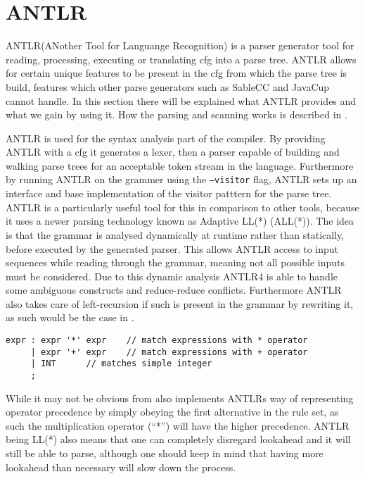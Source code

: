 \section{ANTLR}
ANTLR(ANother Tool for Languange Recognition) is a parser generator tool for reading, processing, executing or translating \gls{cfg} into a parse tree.
ANTLR allows for certain unique features to be present in the \gls{cfg} from which the parse tree is build, features which other parse generators such as SableCC and JavaCup cannot handle. %
In this section there will be explained what ANTLR provides and what we gain by using it.
How the parsing and scanning works is described in .

ANTLR is used for the syntax analysis part of the compiler.
By providing ANTLR with a \gls{cfg} it generates a lexer, then a parser capable of building and walking parse trees for an acceptable token stream in the language.
Furthermore by running ANTLR on the grammer using the \texttt{--visitor} flag, ANTLR sets up an interface and base implementation of the visitor patttern for the parse tree. 
ANTLR is a particularly useful tool for this in comparison to other tools, because it uses a newer parsing technology known as Adaptive LL(*) (ALL(*)).
The idea is that the grammar is analysed dynamically at runtime rather than statically, before executed by the generated parser.
This allows ANTLR access to input sequences while reading through the grammar, meaning not all possible inputs must be considered.
Due to this dynamic analysis ANTLR4 is able to handle some ambiguous constructs and reduce-reduce conflicts.
Furthermore ANTLR also takes care of left-recursion if such is present in the grammar by rewriting it, as such would be the case in .

\begin{lstlisting}[caption=An ambiguous rule for expr,frame=tlrb,label={lst:amb}]
expr : expr '*' expr 	// match expressions with * operator
     | expr '+' expr 	// match expressions with + operator
     | INT 		// matches simple integer
     ;
\end{lstlisting}
While it may not be obvious from  also implements ANTLRs way of representing operator precedence by simply obeying the first alternative in the rule set, as such the multiplication operator (``*'') will have the higher precedence.
ANTLR being LL(*) also means that one can completely disregard lookahead and it will still be able to parse, although one should keep in mind that having more lookahead than necessary will slow down the process.\citep{ANTLR4}

